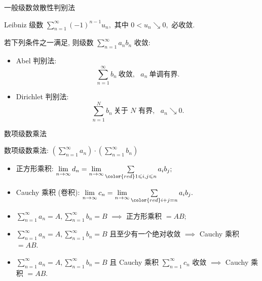 \begin{frame}{一般级数敛散性判别法}

\begin{thm}
Leibniz 级数 $\sum\limits_{n=1}^\infty (-1)^{n-1} u_n,$ 其中 $0 < u_n \searrow 0,$ 必收敛.
\end{thm}

\pause

\begin{thm}[A-D 判别法]
若下列条件之一满足, 则级数 $\sum\limits_{n=1}^{\infty} a_n b_n$ 收敛:
\begin{itemize}[<+->]
\item Abel 判别法:
\[\sum\limits_{n=1}^{\infty} b_n ~ \text{收敛}, ~~~ a_n ~ \text{单调有界}.\]
\item Dirichlet 判别法:
\[\sum\limits_{n=1}^{N} b_n ~ \text{关于 $N$ 有界}, ~~~ a_n \searrow 0.\]
\end{itemize}
\end{thm}

\end{frame}


\begin{frame}{数项级数乘法}

数项级数乘法: $\left( \sum\limits_{n=1}^\infty a_n \right) \cdot \left( \sum\limits_{n=1}^\infty b_n \right)$

\pause

\begin{itemize}
\item 正方形乘积: $\lim\limits_{n\to\infty} d_n = \lim\limits_{n\to\infty} \sum\limits_{\color{red} 1 \leqslant i, j \leqslant n} a_i b_j;$
\pause
\item Cauchy 乘积 (卷积): $\lim\limits_{n\to\infty} c_n = \lim\limits_{n\to\infty} \sum\limits_{\color{red} i+j=n} a_i b_j.$
\end{itemize}

\pause

\begin{prop}[乘积收敛性]
\begin{itemize}[<+->]
\item $\sum\limits_{n=1}^\infty a_n = A, \sum\limits_{n=1}^\infty b_n = B$ $\implies$ 正方形乘积 $= AB;$
\item $\sum\limits_{n=1}^\infty a_n = A, \sum\limits_{n=1}^\infty b_n = B$ 且至少有一个绝对收敛 $\implies$ Cauchy 乘积 $= AB.$
\item $\sum\limits_{n=1}^\infty a_n = A, \sum\limits_{n=1}^\infty b_n = B$ 且 Cauchy 乘积 $\sum\limits_{n=1}^\infty c_n$ 收敛 $\implies$ Cauchy 乘积 $= AB.$
\end{itemize}
\end{prop}

\end{frame}

